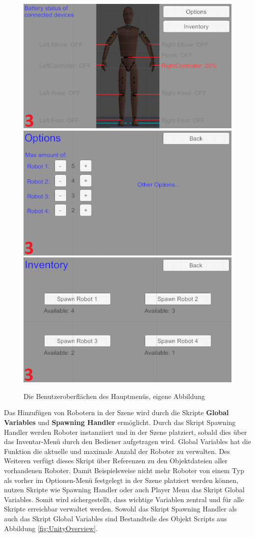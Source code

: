 \begin{figure}[h]
	\centering
	\includegraphics[width=0.45\linewidth]{Bilder/A49_MM1_2}
	\includegraphics[width=0.45\linewidth]{Bilder/A50_MM2_2}
	\includegraphics[width=0.45\linewidth]{Bilder/A51_MM3_2}
	\caption{Die Benutzeroberflächen des Hauptmenüs, eigene Abbildung}
	\label{fig:MainMenu}
\end{figure}
\newline
Das Hinzufügen von Robotern in der Szene wird durch die Skripte \textbf{Global Variables} und \textbf{Spawning Handler} ermöglicht. Durch das Skript Spawning Handler werden Roboter instanziiert und in der Szene platziert, sobald dies über das Inventar-Menü durch den Bediener aufgetragen wird. Global Variables hat die Funktion die aktuelle und maximale Anzahl der Roboter zu verwalten. Des Weiteren verfügt dieses Skript über Referenzen zu den Objektdateien aller vorhandenen Roboter. Damit Beispielsweise nicht mehr Roboter von einem Typ als vorher im Optionen-Menü festgelegt in der Szene platziert werden können, nutzen Skripte wie Spawning Handler oder auch Player Menu das Skript Global Variables. Somit wird sichergestellt, dass wichtige Variablen zentral und für alle Skripte erreichbar verwaltet werden. Sowohl das Skript Spawning Handler als auch das Skript Global Variables sind Bestandteile des Objekt Scripts aus Abbildung \ref{fig:UnityOverview}.
\newline\newline
